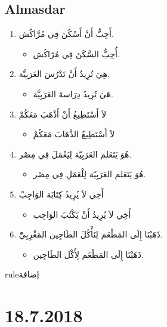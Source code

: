 \documentclass[a4paper]{article}
\begin{document}
\subsection{\textenglish{Almasdar}}
\begin{enumerate}
\item أَحِبُّ أَنْ أَسْكُنَ فِي مُرَّاكُش.
  \begin{itemize}
  \item أُحِبُّ السَّكَنَ فِي مُرّاكُش.
  \end{itemize}
\item هِيَ تُرِيدُ أَنْ تَدْرُسَ العَرَبِيَّة.
  \begin{itemize}
  \item هَيَ تُرِيدُ دِرَاسةَ العَرَبِيَّة.
  \end{itemize}

\item لاَ أَسْتَطِيعُ أَنْ أَذْهَبَ مَعَكُمْ
  \begin{itemize}
  \item لاَ أَسْتَطِيعُ الذَّهَابَ مَعَكُمْ
  \end{itemize}
\item هُوَ يَتَعَلم العَرَبِيّة لِيَعْمَلَ فِي مِصْر.
  \begin{itemize}
  \item هُوَ يَتَعَلم العَرَبِيّة لِلْعَمَلِ فِي مِصْر.
  \end{itemize}
\item أَخِي لاَ يُرِيدُ كِتَابَة الوَاجِبْ
  \begin{itemize}
  \item أَخِي لاَ يُرِيدُ أَنْ يَكْتُبَ الوَاجِب
  \end{itemize}
\item ذَهَبْنَا إِلَى المَطْعَم لِنَأْكُلَ الطَاجِين المَغْرِبِيّْ.
  \begin{itemize}
  \item ذَهَبْنَا إِلَى المَطْعَم لِأَكْل الطَاجِين.
  \end{itemize}
\end{enumerate}

\textenglish{rule}إضافة



\section{18.7.2018}
\end{document}
